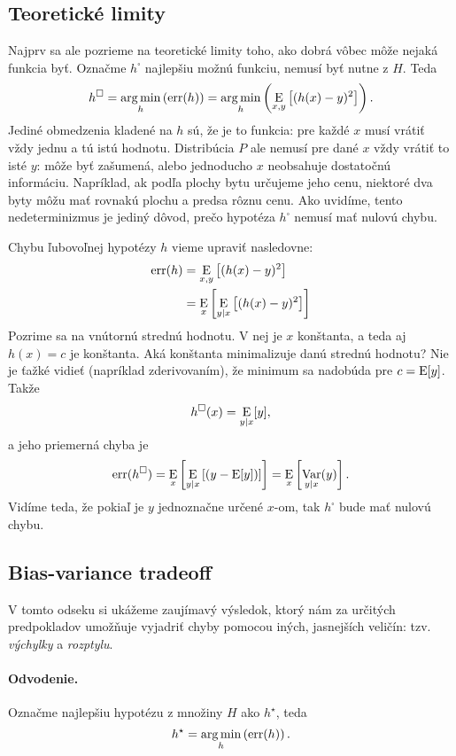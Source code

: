 \subsection{Teoretické limity}
Najprv sa ale pozrieme na teoretické limity toho, ako dobrá vôbec
môže nejaká funkcia byť. Označme $h^{\square}$ najlepšiu možnú funkciu,
nemusí byť nutne z $H$. Teda
$$h^{\square} = \operatorname*{arg\,min}_h \left( \mathrm{err}(h) \right) = \operatorname*{arg\,min}_h \left( \operatorname*{\mathrm{E}}_{x,y} \left[ (h(x) - y)^2 \right] \right).$$
Jediné obmedzenia kladené na $h$ sú, že je to funkcia: pre každé $x$
musí vrátiť vždy jednu a tú istú hodnotu. Distribúcia $P$ ale nemusí
pre dané $x$ vždy vrátiť to isté $y$: môže byť zašumená, alebo
jednoducho $x$ neobsahuje dostatočnú informáciu. Napríklad, ak podľa
plochy bytu určujeme jeho cenu, niektoré dva byty môžu mať rovnakú
plochu a predsa rôznu cenu. Ako uvidíme, tento nedeterminizmus je
jediný dôvod, prečo hypotéza $h^{\square}$ nemusí mať nulovú chybu.

Chybu ľubovoľnej hypotézy $h$ vieme upraviť nasledovne:
\begin{align}
  \mathrm{err}(h)
    &= \operatorname*{\mathrm{E}}_{x,y} \left[ (h(x) - y)^2 \right] \\
    &= \operatorname*{\mathrm{E}}_{x} \left[ \operatorname*{\mathrm{E}}_{y|x} \left[ (h(x) - y)^2 \right] \right]
\end{align}
Pozrime sa na vnútornú strednú hodnotu. V nej je $x$ konštanta, a
teda aj $h(x) = c$ je konštanta. Aká konštanta minimalizuje danú
strednú hodnotu? Nie je ťažké vidieť (napríklad zderivovaním), že
minimum sa nadobúda pre $c = \operatorname*{\mathrm{E}}[y]$. Takže
$$h^{\square}(x) = \operatorname*{\mathrm{E}}_{y|x}[y],$$
a jeho priemerná chyba je
$$\mathrm{err}(h^{\square}) = \operatorname*{\mathrm{E}}_{x} \left[ \operatorname*{\mathrm{E}}_{y|x} \left[ (y - \operatorname*{\mathrm{E}}[y]) \right] \right] = \operatorname*{\mathrm{E}}_{x} \left[ \operatorname*{\mathrm{Var}}_{y|x}(y) \right].$$
Vidíme teda, že pokiaľ je $y$ jednoznačne určené $x$-om, tak
$h^{\square}$ bude mať nulovú chybu.



\subsection{Bias-variance tradeoff}
V tomto odseku si ukážeme zaujímavý výsledok, ktorý nám za určitých
predpokladov umožňuje vyjadriť chyby pomocou iných, jasnejších veličín:
tzv. \emph{výchylky} a \emph{rozptylu}.


\paragraph{Odvodenie.}
Označme najlepšiu hypotézu z množiny $H$ ako $h^\star$, teda
$$h^\star = \operatorname*{arg\,min}_h \left( \mathrm{err}(h) \right).$$

